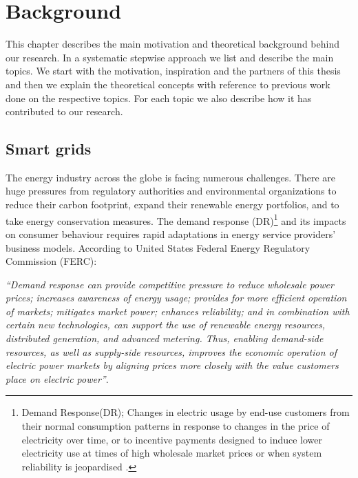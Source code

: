 \chapter{Background}
\label{chapter:background} 

This chapter describes the main motivation and theoretical background behind our research. In a systematic stepwise approach we list and describe the main topics. We start with the motivation, inspiration and the partners of this thesis and then we explain the theoretical concepts with reference to previous work done on the respective topics. For each topic we also describe how it has contributed to our research. 

\section{Smart grids } \label{smartgrid}

The energy industry across the globe is facing numerous challenges. There are huge pressures from regulatory authorities and environmental organizations to reduce their carbon footprint, expand their renewable energy portfolios, and to take energy conservation measures. The demand response (DR)\footnote{Demand Response(DR); Changes in electric usage by end-use customers from their normal consumption patterns in response to changes in the price of electricity over time, or to incentive payments designed to induce lower electricity use at times of high wholesale market prices or when system reliability is jeopardised \cite{balijepalli2011review}.} and its impacts on consumer behaviour requires rapid adaptations in energy service providers' business models. According to United States Federal Energy Regulatory Commission (FERC):
 
\emph{``Demand response can provide competitive pressure to reduce wholesale power prices; increases awareness of energy usage; provides for more efficient operation of markets; mitigates market power; enhances reliability; and in combination with certain new technologies, can support the use of renewable energy resources, distributed generation, and advanced metering. Thus, enabling demand-side resources, as well as supply-side resources, improves the economic operation of electric power markets by aligning prices more closely with the value customers place on electric power''}\cite{federal2008assessment}.
  
